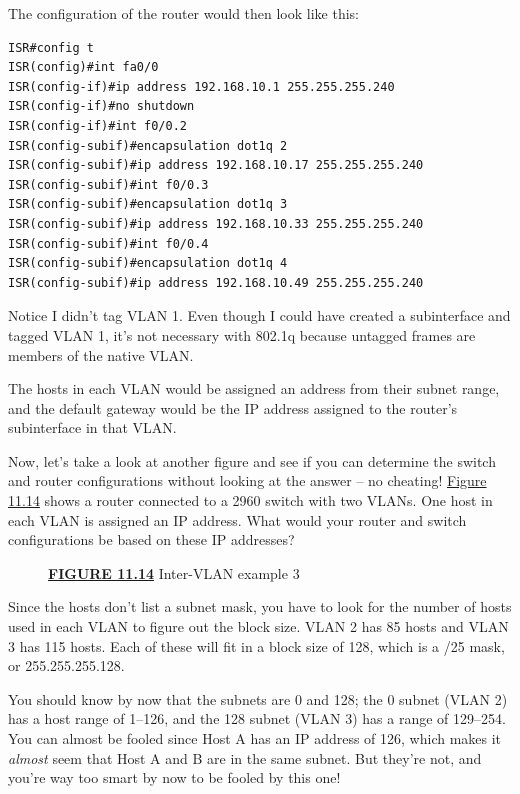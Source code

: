 \documentclass[b5paper,11pt]{memoir}
\begin{document}
The configuration of the router would then look like this:

\begin{verbatim}
ISR#config t
ISR(config)#int fa0/0
ISR(config-if)#ip address 192.168.10.1 255.255.255.240
ISR(config-if)#no shutdown
ISR(config-if)#int f0/0.2
ISR(config-subif)#encapsulation dot1q 2
ISR(config-subif)#ip address 192.168.10.17 255.255.255.240
ISR(config-subif)#int f0/0.3
ISR(config-subif)#encapsulation dot1q 3
ISR(config-subif)#ip address 192.168.10.33 255.255.255.240
ISR(config-subif)#int f0/0.4
ISR(config-subif)#encapsulation dot1q 4
ISR(config-subif)#ip address 192.168.10.49 255.255.255.240
\end{verbatim}

Notice I didn't tag VLAN 1. Even though I could have created a
subinterface and tagged VLAN 1, it's not necessary with 802.1q because
untagged frames are members of the native VLAN.

The hosts in each VLAN would be assigned an address from their subnet
range, and the default gateway would be the IP address assigned to the
router's subinterface in that VLAN.

Now, let's take a look at another figure and see if you can determine
the switch and router configurations without looking at the answer -- no
cheating! \protect\hyperlink{c11.xhtmlux5cux23figure11-14}{Figure 11.14}
shows a router connected to a 2960 switch with two VLANs. One host in
each VLAN is assigned
an IP address. What
would your router and switch configurations be based on these IP
addresses?

\begin{figure}
\centering
\caption{{\protect\hyperlink{c11.xhtmlux5cux23figureanchor11-14}{\textbf{FIGURE
11.14}} Inter-VLAN example 3}}
\end{figure}

Since the hosts don't list a subnet mask, you have to look for the
number of hosts used in each VLAN to figure out the block size. VLAN 2
has 85 hosts and VLAN 3 has 115 hosts. Each of these will fit in a block
size of 128, which is a /25 mask, or 255.255.255.128.

You should know by now that the subnets are 0 and 128; the 0 subnet
(VLAN 2) has a host range of 1--126, and the 128 subnet (VLAN 3) has a
range of 129--254. You can almost be fooled since Host A has an IP
address of 126, which makes it \emph{almost} seem that Host A and B are
in the same subnet. But they're not, and you're way too smart by now to
be fooled by this one!
\end{document}
